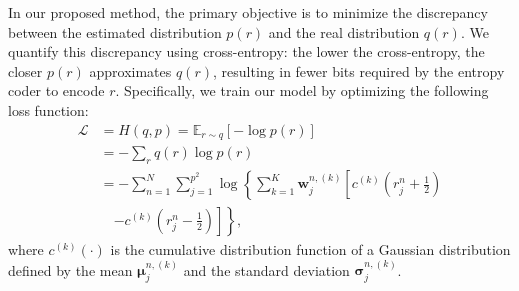 In our proposed method, the primary objective is to minimize the discrepancy between the estimated distribution $p(r)$ and the real distribution $q(r)$. We quantify this discrepancy using cross-entropy: the lower the cross-entropy, the closer $p(r)$ approximates $q(r)$, resulting in fewer bits required by the entropy coder to encode $r$.
Specifically, we train our model by optimizing the following loss function:
\begin{equation}
\begin{aligned}
\mathcal{L} &= H(q, p) = \mathbb{E}_{r \sim q}[-\log p(r)] \\
&= -\sum_r q(r) \log p(r) \\
&= -\sum_{n=1}^{N} \sum_{j=1}^{p^2} \log \left\{ \sum_{k=1}^{K} \boldsymbol{w}^{n,(k)}_j \left[ c^{(k)}(r_j^n + \frac{1}{2}) \right. \right. \\
&\quad \left. \left. - c^{(k)}(r_j^n - \frac{1}{2}) \right] \right\},
\end{aligned}
\end{equation}
where $c^{(k)}(\cdot)$ is the cumulative distribution function of a Gaussian distribution defined by the mean $\boldsymbol \mu^{n,(k)}_j$ and the standard deviation $\boldsymbol \sigma^{n,(k)}_j$. 
